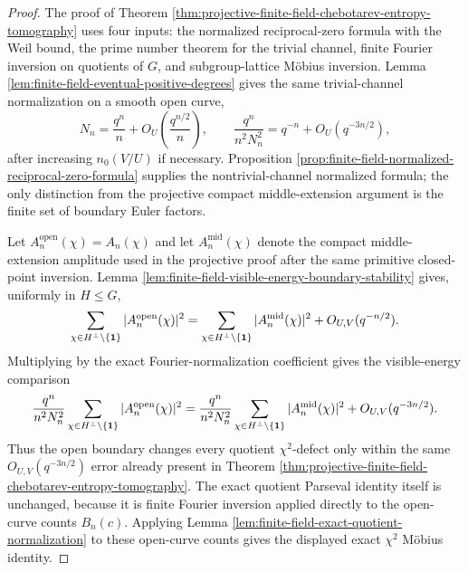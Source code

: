 \begin{proof}
The proof of Theorem \ref{thm:projective-finite-field-chebotarev-entropy-tomography} uses four inputs: the normalized reciprocal-zero formula with the Weil bound, the prime number theorem for the trivial channel, finite Fourier inversion on quotients of \(G\), and subgroup-lattice M\"obius inversion.  Lemma \ref{lem:finite-field-eventual-positive-degrees} gives the same trivial-channel normalization on a smooth open curve,
\[
N_n=\frac{q^n}{n}+O_U\!\left(\frac{q^{n/2}}{n}\right),
\qquad
\frac{q^n}{n^2N_n^2}=q^{-n}+O_U(q^{-3n/2}),
\]
after increasing \(n_0(V/U)\) if necessary.  Proposition \ref{prop:finite-field-normalized-reciprocal-zero-formula} supplies the nontrivial-channel normalized formula; the only distinction from the projective compact middle-extension argument is the finite set of boundary Euler factors.

Let \(A_n^{\mathrm{open}}(\chi)=A_n(\chi)\) and let \(A_n^{\mathrm{mid}}(\chi)\) denote the compact middle-extension amplitude used in the projective proof after the same primitive closed-point inversion.  Lemma \ref{lem:finite-field-visible-energy-boundary-stability} gives, uniformly in \(H\le G\),
\[
\sum_{\chi\in H^\perp\setminus\{\mathbf{1}\}}|A_n^{\mathrm{open}}(\chi)|^2
=
\sum_{\chi\in H^\perp\setminus\{\mathbf{1}\}}|A_n^{\mathrm{mid}}(\chi)|^2
+O_{U,V}(q^{-n/2}).
\]
Multiplying by the exact Fourier-normalization coefficient gives the visible-energy comparison
\[
\frac{q^n}{n^2N_n^2}
\sum_{\chi\in H^\perp\setminus\{\mathbf{1}\}}|A_n^{\mathrm{open}}(\chi)|^2
=
\frac{q^n}{n^2N_n^2}
\sum_{\chi\in H^\perp\setminus\{\mathbf{1}\}}|A_n^{\mathrm{mid}}(\chi)|^2
+O_{U,V}(q^{-3n/2}).
\]
Thus the open boundary changes every quotient \(\chi^2\)-defect only within the same \(O_{U,V}(q^{-3n/2})\) error already present in Theorem \ref{thm:projective-finite-field-chebotarev-entropy-tomography}.  The exact quotient Parseval identity itself is unchanged, because it is finite Fourier inversion applied directly to the open-curve counts \(B_n(c)\). Applying Lemma \ref{lem:finite-field-exact-quotient-normalization} to these open-curve counts gives the displayed exact \(\chi^2\) M\"obius identity.


\end{proof}
